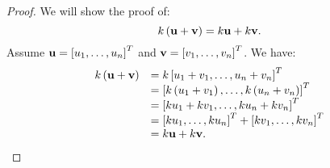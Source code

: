 \begin{proof}
We will show the proof of: 
\begin{equation*}
k \left(\mbox{\bf u}+\mbox{\bf v}\right) = k \mbox{\bf u}+ k \mbox{\bf v}.
\end{equation*}
Assume $\mbox{\bf u}=\left[u_{1},\ldots,u_{n}\right]^T$ and
$\mbox{\bf v}=\left[v_{1},\ldots,v_{n}\right]^T$. We have:
\begin{equation*}
\begin{array}{ll}
k \left(\mbox{\bf u}+\mbox{\bf v}\right) & =k \left[u_{1}+v_{1},\ldots,u_{n}+v_{n}\right]^T \\
& = \left[k \left(u_{1}+v_{1}\right), \ldots, k \left(u_{n}+v_{n}\right) \right]^T \\
& = \left[k u_{1}+ k  v_{1}, \ldots, k u_{n}+ k v_{n}\right]^T \\
& = \left[k u_{1}, \ldots, k u_{n} \right]^T + \left[k v_{1}, \ldots, k v_{n} \right]^T \\
& = k \mbox{\bf u}+k \mbox{\bf v}.
\end{array}
\end{equation*}
\end{proof}

